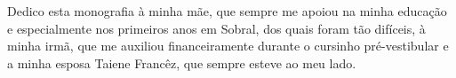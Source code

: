 Dedico esta monografia à minha mãe, que sempre me apoiou na minha
educação e especialmente nos primeiros anos em Sobral, dos quais foram
tão difíceis, à minha irmã, que me auxiliou financeiramente durante o
cursinho pré-vestibular e a minha esposa Taiene Francêz, que sempre esteve ao meu lado.\@
